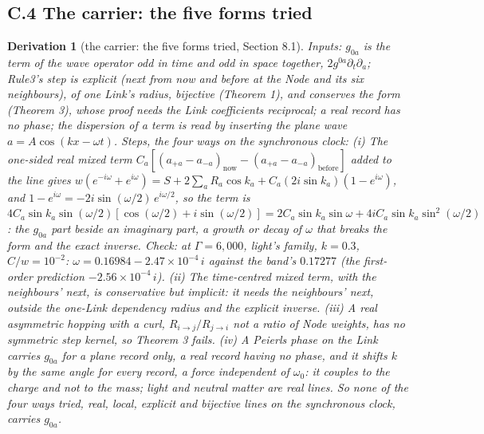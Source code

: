 \documentclass[pdflatex,sn-mathphys-num]{sn-jnl}
\theoremstyle{thmstyleone}
\newtheorem{derivation}{Derivation}
\renewcommand{\thederivation}{S.\arabic{derivation}}
\begin{document}
\subsection*{C.4 The carrier: the five forms tried}

\renewcommand{\thederivation}{C.\arabic{derivation}}\renewcommand{\theHderivation}{C.\arabic{derivation}}\setcounter{derivation}{3}
\begin{derivation}[the carrier: the five forms tried, Section 8.1]
\emph{Inputs:} $g_{0a}$ is the term of the wave operator odd in time and odd in space together, $2g^{0a}\partial_t\partial_a$; Rule3's step is explicit (next from now and before at the Node and its six neighbours), of one Link's radius, bijective (Theorem 1), and conserves the form (Theorem 3), whose proof needs the Link coefficients reciprocal; a real record has no phase; the dispersion of a term is read by inserting the plane wave $a = A\cos(kx - \omega t)$.
\emph{Steps, the four ways on the synchronous clock:} (i) \emph{The one-sided real mixed term} $C_a[(a_{+a} - a_{-a})_{\mathrm{now}} - (a_{+a} - a_{-a})_{\mathrm{before}}]$ added to the line gives $w(e^{-i\omega} + e^{i\omega}) = S + 2\sum_a R_a\cos k_a + C_a(2i\sin k_a)(1 - e^{i\omega})$, and $1 - e^{i\omega} = -2i\sin(\omega / 2)\,e^{i\omega / 2}$, so the term is $4C_a\sin k_a\sin(\omega / 2)[\cos(\omega / 2) + i\sin(\omega / 2)] = 2C_a\sin k_a\sin\omega + 4iC_a\sin k_a\sin^2(\omega / 2)$: the $g_{0a}$ part beside an imaginary part, a growth or decay of $\omega$ that breaks the form and the exact inverse. \emph{Check:} at $\Gamma = 6{,}000$, light's family, $k = 0.3$, $C / w = 10^{-2}$: $\omega = 0.16984 - 2.47 \times 10^{-4}\,i$ against the band's $0.17277$ (the first-order prediction $-2.56 \times 10^{-4}\,i$). (ii) \emph{The time-centred mixed term}, with the neighbours' next, is conservative but implicit: it needs the neighbours' next, outside the one-Link dependency radius and the explicit inverse. (iii) \emph{A real asymmetric hopping} with a curl, $R_{i\to j} / R_{j\to i}$ not a ratio of Node weights, has no symmetric step kernel, so Theorem 3 fails. (iv) \emph{A Peierls phase} on the Link carries $g_{0a}$ for a plane record only, a real record having no phase, and it shifts $k$ by the same angle for every record, a force independent of $\omega_0$: it couples to the charge and not to the mass; light and neutral matter are real lines. So none of the four ways tried, real, local, explicit and bijective lines on the synchronous clock, carries $g_{0a}$.

\end{derivation}
\end{document}
